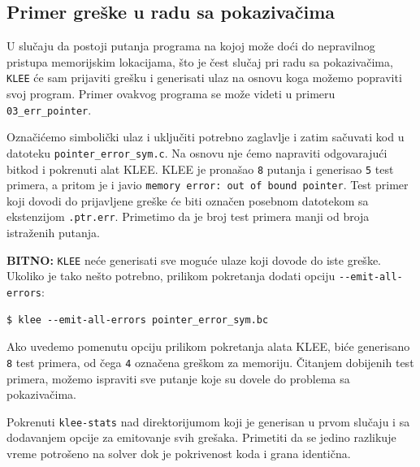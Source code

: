 \subsection{Primer greške u radu sa pokazivačima}\label{primer-greux161ke-u-radu-sa-pokazivaux10dima}

U slučaju da postoji putanja programa na kojoj može doći do nepravilnog pristupa memorijskim lokacijama, što je čest slučaj pri radu sa pokazivačima, \texttt{KLEE} će sam prijaviti grešku i generisati ulaz na osnovu koga možemo popraviti svoj program. Primer ovakvog programa se može videti u primeru \texttt{03\_err\_pointer}.

Označićemo simbolički ulaz i uključiti potrebno zaglavlje i zatim sačuvati kod u datoteku \texttt{pointer\_error\_sym.c}. Na osnovu nje ćemo napraviti odgovarajući bitkod i pokrenuti alat KLEE. KLEE je pronašao \texttt{8} putanja i generisao \texttt{5} test primera, a pritom je i javio \texttt{memory\ error:\ out\ of\ bound\ pointer}. Test primer koji dovodi do prijavljene greške će biti označen posebnom datotekom sa ekstenzijom \texttt{.ptr.err}. Primetimo da je broj test primera manji od broja istraženih putanja.

\textbf{BITNO:} \texttt{KLEE} neće generisati sve moguće ulaze koji dovode do iste greške. Ukoliko je tako nešto potrebno, prilikom pokretanja dodati opciju \texttt{-{}-emit-all-errors}:

\begin{verbatim}
$ klee --emit-all-errors pointer_error_sym.bc
\end{verbatim}

Ako uvedemo pomenutu opciju prilikom pokretanja alata KLEE, biće generisano \texttt{8} test primera, od čega \texttt{4} označena greškom za memoriju. Čitanjem dobijenih test primera, možemo ispraviti sve putanje koje su dovele do problema sa pokazivačima.

Pokrenuti \texttt{klee-stats} nad direktorijumom koji je generisan u prvom slučaju i sa dodavanjem opcije za emitovanje svih grešaka. Primetiti da se jedino razlikuje vreme potrošeno na solver dok je pokrivenost koda i grana identična.
